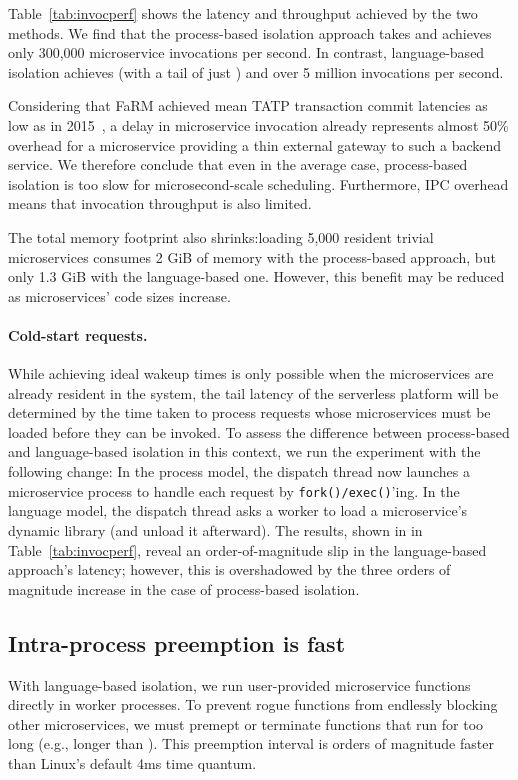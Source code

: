 Table~\ref{tab:invocperf} shows the latency and throughput achieved by the two
methods.  We find that the process-based isolation approach takes  and achieves
only 300,000 microservice invocations per second. In contrast, language-based
isolation achieves  (with a tail of just ) and over 5 million
invocations per second.

Considering that FaRM achieved mean TATP transaction commit latencies as low as
 in 2015~\cite{Dragojevic:sosp2015}, a  delay in microservice invocation
already represents almost 50\% overhead for a microservice providing a thin external
gateway to such a backend service.  We therefore conclude that even in the average
case, process-based isolation is too slow for microsecond-scale scheduling.
Furthermore, IPC overhead means that invocation throughput is also limited.

The total memory footprint also shrinks:\@ loading 5,000 resident
trivial microservices consumes 2 GiB of memory with the process-based approach, but
only 1.3 GiB with the language-based one.  However, this benefit may be reduced as
microservices' code sizes increase.

\paragraph{Cold-start requests.}
While achieving ideal wakeup times is only possible when the microservices are
already resident in the system, the tail latency of the serverless platform will be
determined by the time taken to process requests whose microservices must be loaded
before they can be invoked.  To assess the difference between process-based and
language-based isolation in this context, we run the experiment with the following
change:  In the process model, the dispatch thread now launches a microservice
process to handle each request by \texttt{fork()/exec()}'ing.  In the language model,
the dispatch thread asks a worker to load a microservice's dynamic library (and
unload it afterward).  The results, shown in in Table~\ref{tab:invocperf}, reveal an
order-of-magnitude slip in the language-based approach's latency; however, this is
overshadowed by the three orders of magnitude increase in the case of process-based
isolation.

\subsection{Intra-process preemption is fast}
With language-based isolation, we run user-provided microservice functions
directly in worker processes. To prevent rogue functions from endlessly blocking
other microservices, we must premept or terminate functions that run for too
long (e.g., longer than ).  This preemption interval is orders of
magnitude faster than Linux's default 4ms time quantum.

